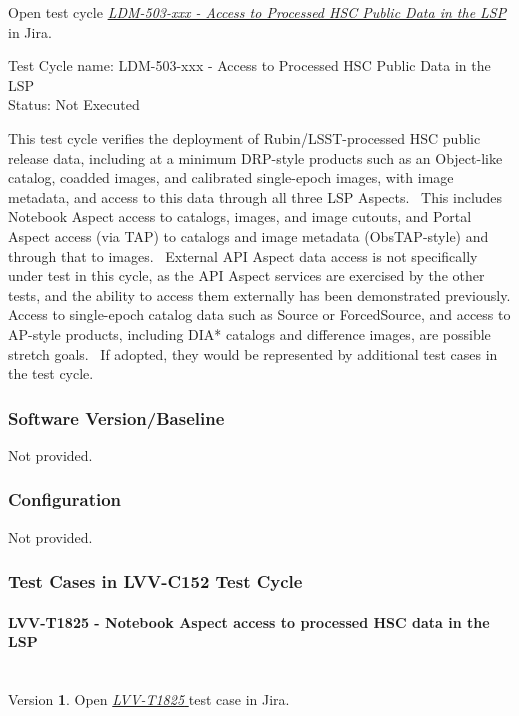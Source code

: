 \documentclass[DM,lsstdraft,STR,toc]{lsstdoc}
\begin{document}
Open test cycle {\it \href{https://jira.lsstcorp.org/secure/Tests.jspa#/testrun/LVV-C152}{LDM-503-xxx - Access to Processed HSC Public Data in the LSP}} in Jira.

Test Cycle name: LDM-503-xxx - Access to Processed HSC Public Data in the LSP\\
Status: Not Executed

This test cycle verifies the deployment of Rubin/LSST-processed HSC
public release data, including at a minimum DRP-style products such as
an Object-like catalog, coadded images, and calibrated single-epoch
images, with image metadata, and access to this data through all three
LSP Aspects. ~This includes Notebook Aspect access to catalogs, images,
and image cutouts, and Portal Aspect access (via TAP) to catalogs and
image metadata (ObsTAP-style) and through that to images. ~External API
Aspect data access is not specifically under test in this cycle, as the
API Aspect services are exercised by the other tests, and the ability to
access them externally has been demonstrated
previously.\\[2\baselineskip]Access to single-epoch catalog data such as
Source or ForcedSource, and access to AP-style products, including DIA*
catalogs and difference images, are possible stretch goals. ~If adopted,
they would be represented by additional test cases in the test cycle.

\subsubsection{Software Version/Baseline}
Not provided.

\subsubsection{Configuration}
Not provided.

\subsubsection{Test Cases in LVV-C152 Test Cycle}

\paragraph{ LVV-T1825 - Notebook Aspect access to processed HSC data in the LSP }\mbox{}\\

Version \textbf{1}.
Open  \href{https://jira.lsstcorp.org/secure/Tests.jspa#/testCase/LVV-T1825}{\textit{ LVV-T1825 } }
test case in Jira.
\end{document}
